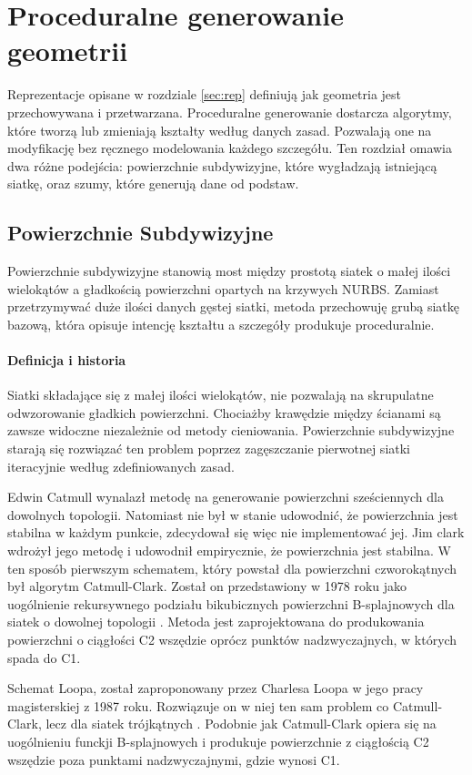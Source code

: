 \section{Proceduralne generowanie geometrii}
\label{sec:gen}
Reprezentacje opisane w rozdziale \ref{sec:rep} definiują jak geometria jest przechowywana i przetwarzana. Proceduralne generowanie dostarcza algorytmy, które tworzą lub zmieniają kształty według danych zasad. Pozwalają one na modyfikację bez ręcznego modelowania każdego szczegółu. Ten rozdział omawia dwa różne podejścia: powierzchnie subdywizyjne, które wygładzają istniejącą siatkę, oraz szumy, które generują dane od podstaw.

\subsection{Powierzchnie Subdywizyjne}
\label{sec:sub}
Powierzchnie subdywizyjne stanowią most między prostotą siatek o małej ilości wielokątów a gładkością powierzchni opartych na krzywych NURBS. Zamiast przetrzymywać duże ilości danych gęstej siatki, metoda przechowuję grubą siatkę bazową, która opisuje intencję kształtu a szczegóły produkuje proceduralnie.

\paragraph{Definicja i historia}
Siatki składające się z małej ilości wielokątów, nie pozwalają na skrupulatne odwzorowanie gładkich powierzchni. Chociażby krawędzie między ścianami są zawsze widoczne niezależnie od metody cieniowania. Powierzchnie subdywizyjne starają się rozwiązać ten problem poprzez zagęszczanie pierwotnej siatki iteracyjnie według zdefiniowanych zasad.

Edwin Catmull wynalazł metodę na generowanie powierzchni sześciennych dla dowolnych topologii. Natomiast nie był w stanie udowodnić, że powierzchnia jest stabilna w każdym punkcie, zdecydował się więc nie implementować jej. Jim clark wdrożył jego metodę i udowodnił empirycznie, że powierzchnia jest stabilna. W ten sposób pierwszym schematem, który powstał dla powierzchni czworokątnych był algorytm Catmull-Clark. Został on przedstawiony w 1978 roku jako uogólnienie rekursywnego podziału bikubicznych powierzchni B-splajnowych dla siatek o dowolnej topologii \cite{catmull1978}. Metoda jest zaprojektowana do produkowania powierzchni o ciągłości C2 wszędzie oprócz punktów nadzwyczajnych, w których spada do C1.

Schemat Loopa, został zaproponowany przez Charlesa Loopa w jego pracy magisterskiej z 1987 roku. Rozwiązuje on w niej ten sam problem co Catmull-Clark, lecz dla siatek trójkątnych \cite{warren2001, zorin2000}. Podobnie jak Catmull-Clark opiera się na uogólnieniu funckji B-splajnowych i produkuje powierzchnie z ciągłością C2 wszędzie poza punktami nadzwyczajnymi, gdzie wynosi C1.

